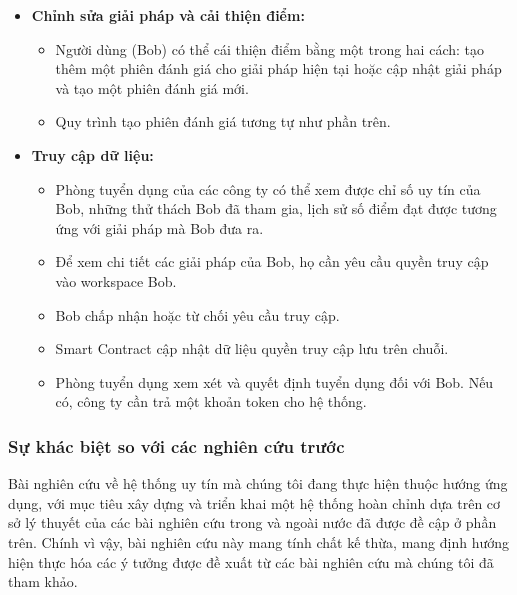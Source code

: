 \documentclass{article}[14pt]
\begin{document}
{\begin{enumerate}[label=\textbf{\alph*.}]
\begin{itemize}
                    \item \textbf{Chỉnh sửa giải pháp và cải thiện điểm:}
                    \begin{itemize} 
                        \item Người dùng (Bob) có thể cái thiện điểm bằng một trong hai cách: tạo thêm một phiên đánh giá cho giải pháp hiện tại hoặc cập nhật giải pháp và tạo một phiên đánh giá mới.
                        \item Quy trình tạo phiên đánh giá tương tự như phần trên.
                    \end{itemize} 

                    \item \textbf{Truy cập dữ liệu:}
                    \begin{itemize} 
                        \item Phòng tuyển dụng của các công ty có thể xem được chỉ số uy tín của Bob, những thử thách Bob đã tham gia, lịch sử số điểm đạt được tương ứng với giải pháp mà Bob đưa ra.
                        \item Để xem chi tiết các giải pháp của Bob, họ cần yêu cầu quyền truy cập vào workspace Bob.
                        \item Bob chấp nhận hoặc từ chối yêu cầu truy cập. 
                        \item Smart Contract cập nhật dữ liệu quyền truy cập lưu trên chuỗi. 
                        \item Phòng tuyển dụng xem xét và quyết định tuyển dụng đối với Bob. Nếu có, công ty cần trả một khoản token cho hệ thống. 
                    \end{itemize}
                \end{itemize}
            \end{enumerate}

        \subsubsection{Sự khác biệt so với các nghiên cứu trước}
            Bài nghiên cứu về hệ thống uy tín mà chúng tôi đang thực hiện thuộc hướng ứng dụng, với mục tiêu xây dựng và triển khai một hệ thống hoàn chỉnh dựa trên cơ sở lý thuyết của các bài nghiên cứu trong và ngoài nước đã được đề cập ở phần trên. Chính vì vậy, bài nghiên cứu này mang tính chất kế thừa, mang định hướng hiện thực hóa các ý tưởng được đề xuất từ các bài nghiên cứu mà chúng tôi đã tham khảo. 
    
}
\end{document}
